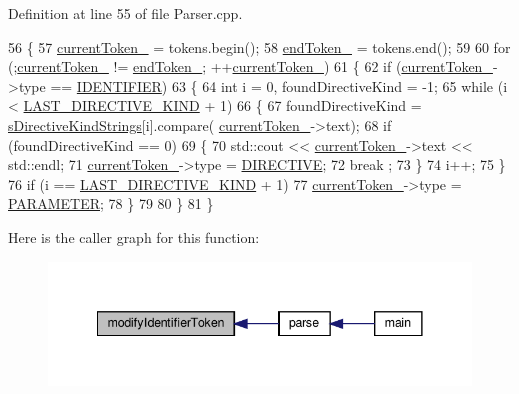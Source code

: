 Definition at line 55 of file Parser.\+cpp.


\begin{DoxyCode}
56     \{
57         \hyperlink{classft_1_1_parser_a942c5b794d108f144c5b5028aaa34cb6}{currentToken\_} = tokens.begin();
58         \hyperlink{classft_1_1_parser_a538ba3ab8ee1d0cef5cc3c999f3ab44c}{endToken\_} = tokens.end();
59 
60         \textcolor{keywordflow}{for} (;\hyperlink{classft_1_1_parser_a942c5b794d108f144c5b5028aaa34cb6}{currentToken\_} != \hyperlink{classft_1_1_parser_a538ba3ab8ee1d0cef5cc3c999f3ab44c}{endToken\_}; ++\hyperlink{classft_1_1_parser_a942c5b794d108f144c5b5028aaa34cb6}{currentToken\_})
61         \{
62             \textcolor{keywordflow}{if} (\hyperlink{classft_1_1_parser_a942c5b794d108f144c5b5028aaa34cb6}{currentToken\_}->type == \hyperlink{namespaceft_aa520fbf142ba1e7e659590c07da31921a84f8ae2490f9e4bd2321fd21f4b0e807}{IDENTIFIER})
63             \{
64                 \textcolor{keywordtype}{int} i = 0, foundDirectiveKind = -1;
65                 \textcolor{keywordflow}{while} (i < \hyperlink{_directive_8hpp_a0ad99aeee867cb461c93463d5772ac86}{LAST\_DIRECTIVE\_KIND} + 1)
66                 \{
67                     foundDirectiveKind = \hyperlink{namespaceft_a2896a632198d516af93e4aea2d125f59}{sDirectiveKindStrings}[i].compare(
      \hyperlink{classft_1_1_parser_a942c5b794d108f144c5b5028aaa34cb6}{currentToken\_}->text);
68                     \textcolor{keywordflow}{if} (foundDirectiveKind == 0)
69                     \{
70                         std::cout << \hyperlink{classft_1_1_parser_a942c5b794d108f144c5b5028aaa34cb6}{currentToken\_}->text << std::endl;
71                         \hyperlink{classft_1_1_parser_a942c5b794d108f144c5b5028aaa34cb6}{currentToken\_}->type = \hyperlink{namespaceft_aa520fbf142ba1e7e659590c07da31921ae3852cb010d5e422026faf83b3c16f0e}{DIRECTIVE};
72                         break ;
73                     \}
74                     i++;
75                 \}
76                 \textcolor{keywordflow}{if} (i == \hyperlink{_directive_8hpp_a0ad99aeee867cb461c93463d5772ac86}{LAST\_DIRECTIVE\_KIND} + 1)
77                     \hyperlink{classft_1_1_parser_a942c5b794d108f144c5b5028aaa34cb6}{currentToken\_}->type = \hyperlink{namespaceft_aa520fbf142ba1e7e659590c07da31921a194cde856bd2d79eac8adb9741c55940}{PARAMETER};
78             \}
79 
80         \}
81     \}
\end{DoxyCode}
Here is the caller graph for this function\+:
\nopagebreak
\begin{figure}[H]
\begin{center}
\leavevmode
\includegraphics[width=341pt]{classft_1_1_parser_a8226e5286bd1e9354998fe9e6bb63d08_icgraph}
\end{center}
\end{figure}
